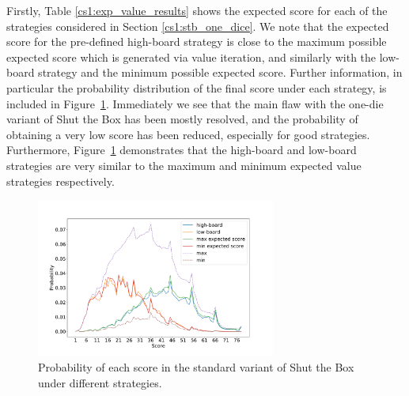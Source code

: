 Firstly, Table \ref{cs1:exp_value_results} shows the expected score for each of the strategies considered in Section \ref{cs1:stb_one_dice}. We note that the expected score for the pre-defined high-board strategy is close to the maximum possible expected score which is generated via value iteration, and similarly with the low-board strategy and the minimum possible expected score. Further information, in particular the probability distribution of the final score under each strategy, is included in Figure~\ref{cs1:stb12_2d6_prob_score}. Immediately we see that the main flaw with the one-die variant of Shut the Box has been mostly resolved, and the probability of obtaining a very low score has been reduced, especially for good strategies. Furthermore, Figure~\ref{cs1:stb12_2d6_prob_score} demonstrates that the high-board and low-board strategies are very similar to the maximum and minimum expected value strategies respectively.


\begin{figure}
    \centering
    \vspace*{-0.4cm}    \includegraphics[width=0.7\textwidth]{images/ShutTheBox/stb12_2d6_prob_score.pdf}
     \vspace*{-0.4cm}
   \caption{Probability of each score in the standard variant of Shut the Box under different strategies.}
    \vspace*{-0.2cm}
\label{cs1:stb12_2d6_prob_score}
\end{figure}



